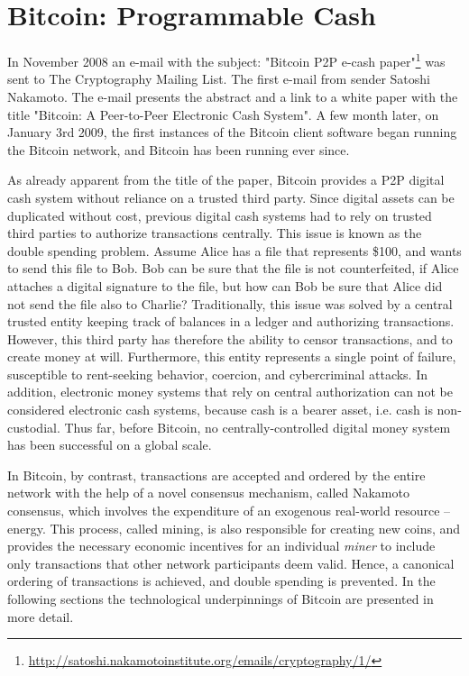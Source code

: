 \section{Bitcoin: Programmable Cash}

 In November 2008 an e-mail with the subject: "Bitcoin P2P e-cash paper"\footnote{\url{http://satoshi.nakamotoinstitute.org/emails/cryptography/1/}} was sent to The Cryptography Mailing List. The first e-mail from sender Satoshi Nakamoto. The e-mail presents the abstract and a link to a white paper with the title "Bitcoin: A Peer-to-Peer Electronic Cash System". A few month later, on January 3rd 2009, the first instances of the Bitcoin client software began running the Bitcoin network, and Bitcoin has been running ever since. 

 As already apparent from the title of the paper, Bitcoin provides a \ac{P2P} digital cash system without reliance on a trusted third party. Since digital assets can be duplicated without cost, previous digital cash systems had to rely on trusted third parties to authorize transactions centrally. This issue is known as the double spending problem. Assume Alice has a file that represents \$100, and wants to send this file to Bob. Bob can be sure that the file is not counterfeited, if Alice attaches a digital signature to the file, but how can Bob be sure that Alice did not send the file also to Charlie? Traditionally, this issue was solved by a central trusted entity keeping track of balances in a ledger and authorizing transactions. However, this third party has therefore the ability to censor transactions, and to create money at will. Furthermore, this entity represents a single point of failure, susceptible to rent-seeking behavior, coercion, and cybercriminal attacks. In addition, electronic money systems that rely on central authorization can not be considered electronic cash systems, because cash is a bearer asset, i.e. cash is non-custodial. Thus far, before Bitcoin, no centrally-controlled digital money system has been successful on a global scale.

 In Bitcoin, by contrast, transactions are accepted and ordered by the entire network with the help of a novel consensus mechanism, called Nakamoto consensus, which involves the expenditure of an exogenous real-world resource -- energy. This process, called mining, is also responsible for creating new coins, and provides the necessary economic incentives for an individual \emph{miner} to include only transactions that other network participants deem valid. Hence, a canonical ordering of transactions is achieved, and double spending is prevented. In the following sections the technological underpinnings of Bitcoin are presented in more detail. 


